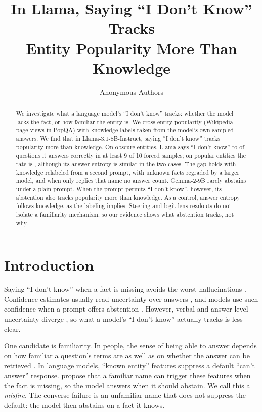\documentclass{article}
\title{In Llama, Saying ``I Don't Know'' Tracks\\Entity Popularity More Than Knowledge}
\author{Anonymous Authors}
\newcommand{\idk}{``I don't know''}
\begin{document}
\maketitle

\begin{abstract}
We investigate what a language model's \idk{} tracks: whether the model lacks the fact, or how familiar the entity is. We cross entity popularity (Wikipedia page views in PopQA) with knowledge labels taken from the model's own sampled answers. We find that in Llama-3.1-8B-Instruct, saying \idk{} tracks popularity more than knowledge. On obscure entities, Llama says \idk{} to \tcObsKnownAbsPct{} of questions it answers correctly in at least 9 of 10 forced samples; on popular entities the rate is \tcPopKnownAbsPct, although its answer entropy is similar in the two cases. The gap holds with knowledge relabeled from a second prompt, with unknown facts regraded by a larger model, and when only replies that name no answer count. Gemma-2-9B rarely abstains under a plain prompt. When the prompt permits \idk, however, its abstention also tracks popularity more than knowledge. As a control, answer entropy follows knowledge, as the labeling implies. Steering and logit-lens readouts do not isolate a familiarity mechanism, so our evidence shows what abstention tracks, not why.
\end{abstract}

\section{Introduction}

Saying \idk{} when a fact is missing avoids the worst hallucinations \citep{kalai2025hallucinate}. Confidence estimates usually read uncertainty over answers \citep{kadavath2022know,kuhn2023semantic,stolfo2024confidence}, and models use such confidence when a prompt offers abstention \citep{kumaran2026confidence}. However, verbal and answer-level uncertainty diverge \citep{ji2025hedging}, so what a model's \idk{} actually tracks is less clear.

One candidate is familiarity. In people, the sense of being able to answer depends on how familiar a question's terms are as well as on whether the answer can be retrieved \citep{reder1992,schwartz1992,koriat2001cascade}. In language models, ``known entity'' features suppress a default ``can't answer'' response. \citet{lindsey2025biology} propose that a familiar name can trigger these features when the fact is missing, so the model answers when it should abstain. We call this a \emph{misfire}. The converse failure is an unfamiliar name that does not suppress the default: the model then abstains on a fact it knows.
\end{document}
